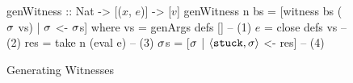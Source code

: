 
\begin{figure}[ht]
\centering
\begin{mcode}
genWitness :: Nat -> [($x$, $e$)] -> [$v$]
genWitness n bs
       = [witness bs ($\sigma$ vs) | $\sigma$ <- $\sigma$s]
  where
   vs  = genArgs defs []      -- (1)
   $e$    = close defs vs        -- (2)
   res = take n (eval e)      -- (3)
   $\sigma$s   = [$\sigma$ | $\langle \mathtt{stuck}, \sigma \rangle$ <- res]  -- (4)
\end{mcode}
\caption{Generating Witnesses}
\label{fig:algo-gen-witness}
\end{figure}


